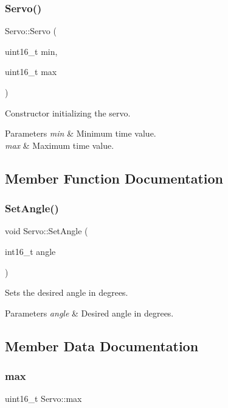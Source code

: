 \subsubsection{\texorpdfstring{Servo()}{Servo()}}
{\footnotesize\ttfamily Servo\+::\+Servo (\begin{DoxyParamCaption}\item[{uint16\+\_\+t}]{min,  }\item[{uint16\+\_\+t}]{max }\end{DoxyParamCaption})}

Constructor initializing the servo. 
\begin{DoxyParams}{Parameters}
{\em min} & Minimum time value. \\
\hline
{\em max} & Maximum time value. \\
\hline
\end{DoxyParams}


\subsection{Member Function Documentation}
\hypertarget{class_servo_ae5ebb4d5baa92a4427e51d7667b41fbf}{}\label{class_servo_ae5ebb4d5baa92a4427e51d7667b41fbf} 
\subsubsection{\texorpdfstring{Set\+Angle()}{SetAngle()}}
{\footnotesize\ttfamily void Servo\+::\+Set\+Angle (\begin{DoxyParamCaption}\item[{int16\+\_\+t}]{angle }\end{DoxyParamCaption})}

Sets the desired angle in degrees. 
\begin{DoxyParams}{Parameters}
{\em angle} & Desired angle in degrees. \\
\hline
\end{DoxyParams}


\subsection{Member Data Documentation}
\hypertarget{class_servo_a685a44f23a5f1a58577bbf88bba3997e}{}\label{class_servo_a685a44f23a5f1a58577bbf88bba3997e} 
\subsubsection{\texorpdfstring{max}{max}}
{\footnotesize\ttfamily uint16\+\_\+t Servo\+::max\hspace{0.3cm}{\ttfamily [private]}}

